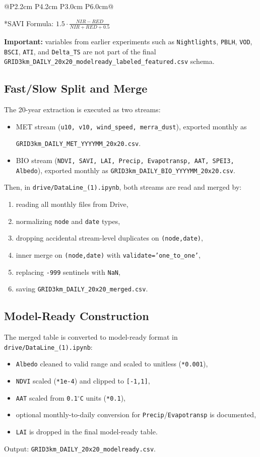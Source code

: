 \documentclass[12pt,a4paper]{article}
\begin{document}
\begin{latin}
\begin{latin}
{\begin{longtable}{@{}P{2.2cm} P{4.2cm} P{3.0cm} P{6.0cm}@{}}
\end{longtable}
}

\noindent\small{*SAVI Formula: $1.5 \cdot \frac{NIR-RED}{NIR+RED+0.5}$}

\end{latin}
\noindent\textbf{Important:} variables from earlier experiments such as \texttt{Nightlights}, \texttt{PBLH}, \texttt{VOD}, \texttt{BSCI}, \texttt{ATI}, and \texttt{Delta\_TS} are not part of the final \texttt{GRID3km\_DAILY\_20x20\_modelready\_labeled\_featured.csv} schema.

\subsection{Fast/Slow Split and Merge}
The 20-year extraction is executed as two streams:
\begin{itemize}
\item MET stream (\texttt{u10, v10, wind\_speed, merra\_dust}), exported monthly as 

\texttt{GRID3km\_DAILY\_MET\_YYYYMM\_20x20.csv}.
\item BIO stream (\texttt{NDVI, SAVI, LAI, Precip, Evapotransp, AAT, SPEI3, Albedo}), exported monthly as \texttt{GRID3km\_DAILY\_BIO\_YYYYMM\_20x20.csv}.
\end{itemize}
Then, in \texttt{drive/DataLine\_(1).ipynb}, both streams are read and merged by:
\begin{enumerate}
\item reading all monthly files from Drive,
\item normalizing \texttt{node} and \texttt{date} types,
\item dropping accidental stream-level duplicates on \texttt{(node,date)},
\item inner merge on \texttt{(node,date)} with \texttt{validate='one\_to\_one'},
\item replacing \texttt{-999} sentinels with \texttt{NaN},
\item saving \texttt{GRID3km\_DAILY\_20x20\_merged.csv}.
\end{enumerate}

\subsection{Model-Ready Construction}
The merged table is converted to model-ready format in \texttt{drive/DataLine\_(1).ipynb}:
\begin{itemize}
\item \texttt{Albedo} cleaned to valid range and scaled to unitless (\texttt{*0.001}),
\item \texttt{NDVI} scaled (\texttt{*1e-4}) and clipped to \texttt{[-1,1]},
\item \texttt{AAT} scaled from \texttt{0.1$^\circ$C} units (\texttt{*0.1}),
\item optional monthly-to-daily conversion for \texttt{Precip}/\texttt{Evapotransp} is documented,
\item \texttt{LAI} is dropped in the final model-ready table.
\end{itemize}
Output: \texttt{GRID3km\_DAILY\_20x20\_modelready.csv}.


\end{latin}
\end{document}
